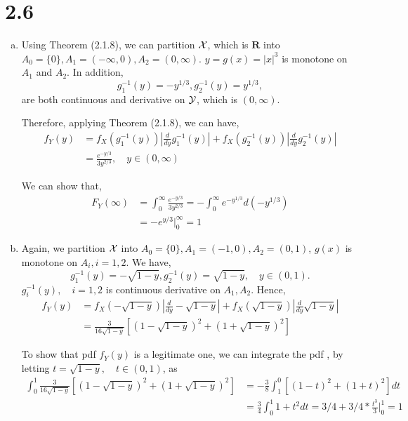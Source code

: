 \documentclass[letterpaper]{article}
\newcommand{\cX}{\cal{X}}
\newcommand{\cY}{\cal{Y}}
\begin{document}
    \section*{2.6}
    \begin{enumerate}[(a)]
    \item Using Theorem (2.1.8), we can partition $\cX$, which is $\mathbf{R}$
    into $A_0 = \{0\}, A_1 = (-\infty, 0), A_2 = (0, \infty)$. $y=g(x) = |x|^3$
    is monotone on $A_1$ and $A_2$. In addition,
    \[
    g_1^{-1}(y) = -y^{1/3}, g_2^{-1}(y) = y^{1/3},
    \] 
    are both continuous and derivative on $\cY$, which is $(0, \infty)$.

    Therefore, applying Theorem (2.1.8), we can have,
    \begin{align*}
    f_Y(y) & = f_X\left(g_1^{-1}(y)\right)\left|\frac{d}{dy} g_1^{-1}(y)\right| +
    f_X\left(g_2^{-1}(y)\right)\left|\frac{d}{dy} g_2^{-1}(y)\right| \\
    & = \frac{e^{-y/3}}{3y^{2/3}}, \quad y \in (0, \infty)
    \end{align*}

    We can show that,
    \begin{align*}
    F_Y(\infty) & = \int_0^\infty \frac{e^{-y/3}}{3 y^{2/3}} =
    - \int_0^\infty e^{-y^{1/3}} d(-y^{1/3}) \\
    & = -e^{y/3}\rvert^\infty_0 = 1
    \end{align*}

    \item Again, we partition $\cX$ into 
    $A_0 = \{0\}, A_1 = (-1, 0), A_2 = (0,1)$, $g(x)$ is monotone on 
    $A_i, i = 1,2$. 
    We have,
    \[
    g_1^{-1}(y) = -\sqrt{1-y}, g_2^{-1}(y) = \sqrt{1-y}, \quad y \in (0,1).
    \]
    $g_i^{-1}(y),\quad i=1,2$ is continuous derivative on $A_1, A_2$. 
    Hence, 
    \begin{align*}
    f_Y(y) & = f_X(-\sqrt{1-y})\left| \frac{d}{dy} -\sqrt{1-y} \right|
    + f_X(\sqrt{1-y})\left| \frac{d}{dy} \sqrt{1-y} \right| \\
    & = \frac{3}{16\sqrt{1-y}}\left[(1-\sqrt{1-y})^2 + (1+\sqrt{1-y})^2\right]
    \end{align*}

    To show that pdf $f_Y(y)$ is a legitimate one, we can integrate the pdf , by letting $t = \sqrt{1-y}, \quad t \in (0, 1)$, as
    \begin{align*}
    \int_0^1 \frac{3}{16\sqrt{1-y}}\left[(1-\sqrt{1-y})^2 + (1+\sqrt{1-y})^2\right] & = -\frac{3}{8} \int_1^0 [(1-t)^2+(1+t)^2] dt \\
    & = \frac{3}{4} \int_0^1 1+ t^2 dt = 3/4 + 3/4*\frac{t^3}{3}|^1_0 = 1
    \end{align*}


\end{enumerate}
\end{document}
